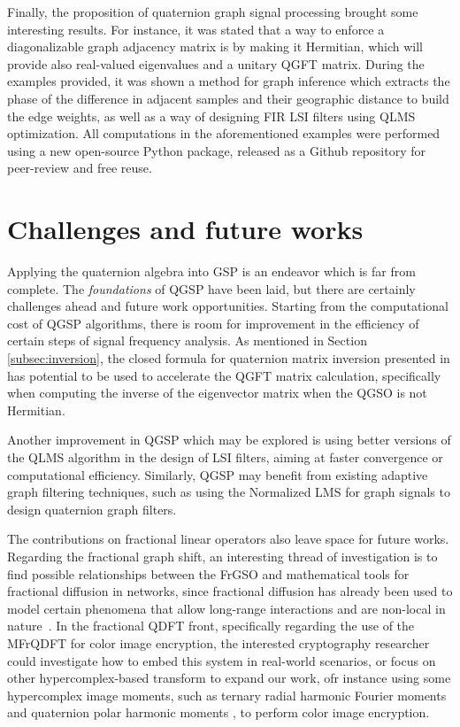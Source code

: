 Finally, the proposition of quaternion graph signal processing brought some interesting results. For instance, it was stated that a way to enforce a diagonalizable graph adjacency matrix is by making it Hermitian, which will provide also real-valued eigenvalues and a unitary QGFT matrix. During the examples provided, it was shown a method for graph inference which extracts the phase of the difference in adjacent samples and their geographic distance to build the edge weights, as well as a way of designing FIR LSI filters using QLMS optimization. All computations in the aforementioned examples were performed using a new open-source Python package, released as a Github repository for peer-review and free reuse.

\section{Challenges and future works}

Applying the quaternion algebra into GSP is an endeavor which is far from complete. The \textit{foundations} of QGSP have been laid, but there are certainly challenges ahead and future work opportunities. Starting from the computational cost of QGSP algorithms, there is room for improvement in the efficiency of certain steps of signal frequency analysis. As mentioned in Section \ref{subsec:inversion}, the closed formula for quaternion matrix inversion presented in \parencite{cohen1999quaternionic} has potential to be used to accelerate the QGFT matrix calculation, specifically when computing the inverse of the eigenvector matrix when the QGSO is not Hermitian.

Another improvement in QGSP which may be explored is using better versions of the QLMS algorithm \parencite{ogunfunmi2015adaptive} in the design of LSI filters, aiming at faster convergence or computational efficiency. Similarly, QGSP may benefit from existing adaptive graph filtering techniques, such as using the Normalized LMS for graph signals \parencite{spelta2020normalized} to design quaternion graph filters.

The contributions on fractional linear operators also leave space for future works. Regarding the fractional graph shift, an interesting thread of investigation is to find possible relationships between the FrGSO and mathematical tools for fractional diffusion in networks, since fractional diffusion has already been used to model certain phenomena that allow long-range interactions and are non-local in nature~\parencite{ilic2005,riascos2014,estrada2021,antil2021}. In the fractional QDFT front, specifically regarding the use of the MFrQDFT for color image encryption, the interested cryptography researcher could investigate how to embed this system in real-world scenarios, or focus on other hypercomplex-based transform to expand our work, ofr instance using some hypercomplex image moments, such as ternary radial harmonic Fourier moments and quaternion polar harmonic moments \parencite{wang2019ternary,wang2018quaternion}, to perform color image encryption.
